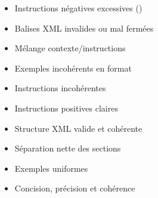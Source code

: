 \begin{Exemple}
\end{Exemple}
\vspace{-0.5cm}\begin{Remarque}
    \vspace{-0.5cm}\begin{Colonnes}[2]%
        \begin{tcolorbox}[title={\textcolor{red!75!white}{\textcolor{red}{\faTimes} À éviter}}, colback=red!5]
            \begin{itemize}[label=$\times$]
                \item Instructions négatives excessives ()
                \item Balises XML invalides ou mal fermées
                \item Mélange contexte/instructions
                \item Exemples incohérents en format
                \item Instructions incohérentes
            \end{itemize}
        \end{tcolorbox}
        \begin{tcolorbox}[title={\textcolor{green!70!black}{$\checkmark$ Bonnes pratiques}}, colback=green!5]
            \begin{itemize}[label=$\checkmark$]
                \item Instructions positives claires
                \item Structure XML valide et cohérente
                \item Séparation nette des sections
                \item Exemples uniformes
                \item Concision, précision et cohérence
            \end{itemize}
        \end{tcolorbox}
    \end{Colonnes}
\end{Remarque}
